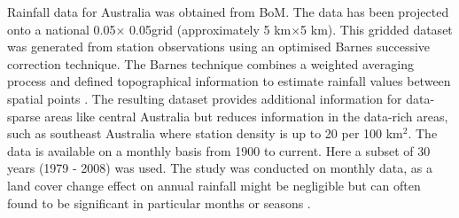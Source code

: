 \documentclass[draft,linenumbers]{agujournal}
\begin{document}
\begin{article}
Rainfall data for Australia \citep{Jones2009} was obtained from BoM. The data has been projected onto a national 0.05\textdegree $\times$ 0.05\textdegree grid (approximately 5 km$\times$5 km). This gridded dataset was generated from station observations using an optimised Barnes successive correction technique. The Barnes technique combines a weighted averaging process and defined topographical information to estimate rainfall values between spatial points \citep{BoM2009}. The resulting dataset provides additional information for data-sparse areas like central Australia but reduces information in the data-rich areas, such as southeast Australia where station density is up to 20 per 100 km$^2$. The data is available on a monthly basis from 1900 to current. Here a subset of 30 years (1979 - 2008) was used. The study was conducted on monthly data, as a land cover change effect on annual rainfall might be negligible but can often found to be significant in particular months or seasons \citep[e.g.][]{Otterman1990,Gaertner2001,Semazzi2001,Oleson2004,Deo2009}. 



\end{article}
\end{document}
